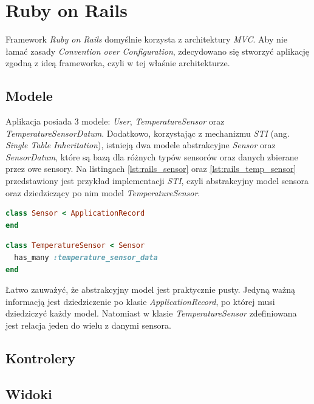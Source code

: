 \section{Ruby on Rails}
Framework \emph{Ruby on Rails} domyślnie korzysta z architektury \emph{MVC}. Aby nie łamać zasady \emph{Convention over Configuration}, zdecydowano się stworzyć aplikację zgodną z ideą frameworka, czyli w tej właśnie architekturze.

\subsection{Modele}
Aplikacja posiada 3 modele: \emph{User}, \emph{TemperatureSensor} oraz \emph{TemperatureSensorDatum}. Dodatkowo, korzystając z mechanizmu \emph{STI} (ang. \emph{Single Table Inheritation}), istnieją dwa modele abstrakcyjne \emph{Sensor} oraz \emph{SensorDatum}, które są bazą dla różnych typów sensorów oraz danych zbierane przez owe sensory. Na listingach \ref{lst:rails_sensor} oraz \ref{lst:rails_temp_sensor} przedstawiony jest przykład implementacji \emph{STI}, czyli abstrakcyjny model sensora oraz dziedziczący po nim model \emph{TemperatureSensor}.
\newpage

\begin{lstlisting}[caption={Abstrakcyjny model sensora w Ruby on Rails.},label={lst:rails_sensor},language=Ruby]
class Sensor < ApplicationRecord
end
\end{lstlisting}

\begin{lstlisting}[caption={Model sensora temperatury w Ruby on Rails.},label={lst:rails_temp_sensor},language=Ruby]
class TemperatureSensor < Sensor
  has_many :temperature_sensor_data
end
\end{lstlisting}

Łatwo zauważyć, że abstrakcyjny model jest praktycznie pusty. Jedyną ważną informacją jest dziedziczenie po klasie \emph{ApplicationRecord}, po której musi dziedziczyć każdy model. Natomiast w klasie \emph{TemperatureSensor} zdefiniowana jest relacja jeden do wielu z danymi sensora.

\subsection{Kontrolery}


\subsection{Widoki}


